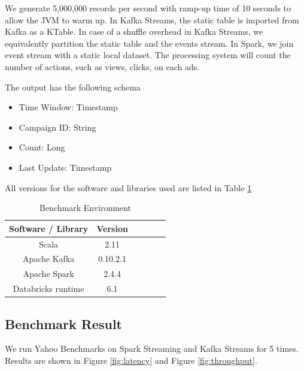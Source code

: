 \documentclass[pdftex,twocolumn,10pt,letterpaper]{article}
\begin{document}
We generate 5,000,000 records per second with ramp-up time of 10 seconds to allow the JVM to warm up. In Kafka Streams, the static table is imported from Kafka as a KTable. In case of a shuffle overhead in Kafka Streams, we equivalently partition the static table and the events stream. In Spark, we join event stream with a static local dataset. The processing system will count the number of actions, such as views, clicks, on each ads. 

The output has the following schema

\begin{itemize}
    \item Time Window: Timestamp
    \item Campaign ID: String
    \item Count: Long
    \item Last Update: Timestamp
\end{itemize}

All versions for the software and libraries used are listed in Table \ref{tab:setup} 

\begin{table}[]
    \centering
    \begin{tabular}{|c|c|c|c|c|c|}
         \hline
         Software / Library & Version \\
         \hline
         Scala & 2.11 \\ 
         \hline
         Apache Kafka & 0.10.2.1 \\ 
         \hline
         Apache Spark & 2.4.4 \\
         \hline
         Databricks runtime & 6.1 \\ 
         \hline
    \end{tabular}
    \caption{Benchmark Environment}
    \label{tab:setup}
\end{table}


\subsection{Benchmark Result}
We run Yahoo Benchmarks on Spark Streaming and Kafka Streams for 5 times. Results are shown in Figure \ref{fig:latency} and Figure \ref{fig:throughput}. 
\end{document}
